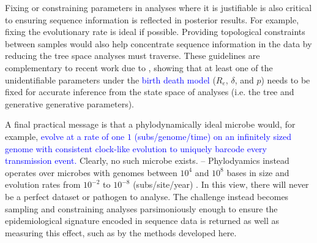 \documentclass{article}
\begin{document}
Fixing or constraining parameters in analyses where it is justifiable is also critical to ensuring sequence information is reflected in posterior results. For example, fixing the evolutionary rate is ideal if possible. Providing topological constraints between samples would also help concentrate sequence information in the data by reducing the tree space analyses must traverse. These guidelines are complementary to recent work due to \citet{louca2021fundamental}, showing that at least one of the unidentifiable parameters under the \textcolor{blue}{birth death model} ($R_e$, $\delta$, and $p$) needs to be fixed for accurate inference from the state space  of analyses (i.e. the tree and generative generative parameters).

A final practical message is that a phylodynamically ideal microbe would, for example, \textcolor{blue}{evolve at a rate of one $1$ (subs/genome/time) on an infinitely sized genome with consistent clock-like evolution to uniquely barcode every transmission event.} Clearly, no such microbe exists. -- Phylodyamics instead operates over microbes with genomes between $10^4$ and $10^8$ bases in size and evolution rates from $10^{-2}$ to $10^{-8}$ (subs/site/year) \citep{Biek2015Mesurably}. In this view, there will never be a perfect dataset or pathogen to analyse. The challenge instead becomes sampling and constraining analyses parsimoniously enough to ensure the epidemiological signature encoded in sequence data is returned as well as measuring this effect, such as by the methods developed here.
\end{document}
